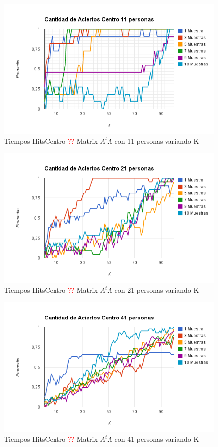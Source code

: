 \begin{figure}[H]
\includegraphics[width=1\textwidth]{img/image13.png}
     \caption{Tiempos HitsCentro \textcolor{red}{??} Matrix $A^tA$ con 11 personas variando K}
     \label{fig:figura1}
\end{figure}

\begin{figure}[H]
\includegraphics[width=1\textwidth]{img/image14.png}
     \caption{Tiempos HitsCentro \textcolor{red}{??} Matrix $A^tA$ con 21 personas variando K}
     \label{fig:figura1}
\end{figure}

\begin{figure}[H]
\includegraphics[width=1\textwidth]{img/image15.png}
     \caption{Tiempos HitsCentro \textcolor{red}{??} Matrix $A^tA$ con 41 personas variando K}
     \label{fig:figura1}
\end{figure}

